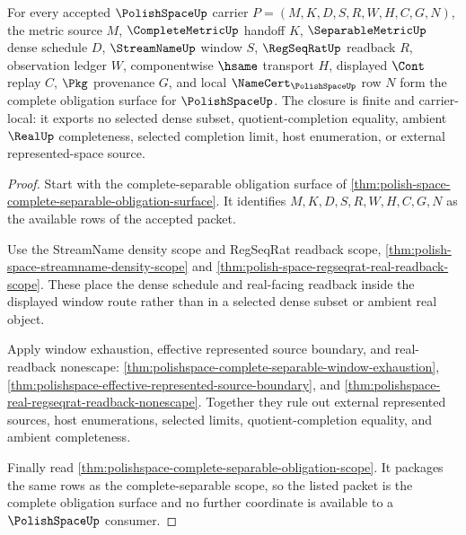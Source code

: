 \begin{theorem}
\label{thm:polishspace-complete-separable-obligation-closure}
For every accepted $\PolishSpaceUp$ carrier $P=(M,K,D,S,R,W,H,C,G,N)$, the metric source $M$, $\CompleteMetricUp$ handoff $K$, $\SeparableMetricUp$ dense schedule $D$, $\StreamNameUp$ window $S$, $\RegSeqRatUp$ readback $R$, observation ledger $W$, componentwise $\hsame$ transport $H$, displayed $\Cont$ replay $C$, $\Pkg$ provenance $G$, and local $\NameCert_{\PolishSpaceUp}$ row $N$ form the complete obligation surface for $\PolishSpaceUp$. The closure is finite and carrier-local: it exports no selected dense subset, quotient-completion equality, ambient $\RealUp$ completeness, selected completion limit, host enumeration, or external represented-space source.
\end{theorem}
\begin{proof}
Start with the complete-separable obligation surface of \autoref{thm:polish-space-complete-separable-obligation-surface}. It identifies $M,K,D,S,R,W,H,C,G,N$ as the available rows of the accepted packet.

Use the StreamName density scope and RegSeqRat readback scope, \autoref{thm:polish-space-streamname-density-scope} and \autoref{thm:polish-space-regseqrat-real-readback-scope}. These place the dense schedule and real-facing readback inside the displayed window route rather than in a selected dense subset or ambient real object.

Apply window exhaustion, effective represented source boundary, and real-readback nonescape: \autoref{thm:polishspace-complete-separable-window-exhaustion}, \autoref{thm:polishspace-effective-represented-source-boundary}, and \autoref{thm:polishspace-real-regseqrat-readback-nonescape}. Together they rule out external represented sources, host enumerations, selected limits, quotient-completion equality, and ambient completeness.

Finally read \autoref{thm:polishspace-complete-separable-obligation-scope}. It packages the same rows as the complete-separable scope, so the listed packet is the complete obligation surface and no further coordinate is available to a $\PolishSpaceUp$ consumer.
\end{proof}

